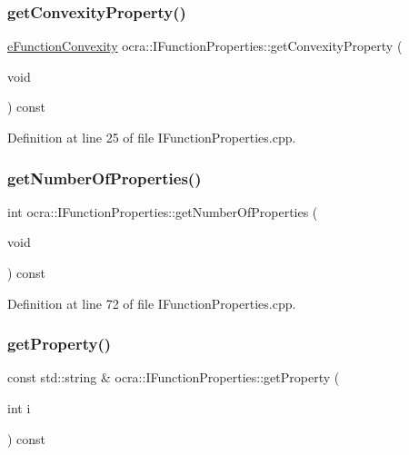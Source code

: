 \subsubsection{\texorpdfstring{get\+Convexity\+Property()}{getConvexityProperty()}}
{\footnotesize\ttfamily \hyperlink{namespaceocra_ae6e8dca6121e9618486a449754876119}{e\+Function\+Convexity} ocra\+::\+I\+Function\+Properties\+::get\+Convexity\+Property (\begin{DoxyParamCaption}\item[{void}]{ }\end{DoxyParamCaption}) const}



Definition at line 25 of file I\+Function\+Properties.\+cpp.

\hypertarget{classocra_1_1IFunctionProperties_ae0290dc1f3be7295512af731ede8c981}{}\label{classocra_1_1IFunctionProperties_ae0290dc1f3be7295512af731ede8c981} 
\subsubsection{\texorpdfstring{get\+Number\+Of\+Properties()}{getNumberOfProperties()}}
{\footnotesize\ttfamily int ocra\+::\+I\+Function\+Properties\+::get\+Number\+Of\+Properties (\begin{DoxyParamCaption}\item[{void}]{ }\end{DoxyParamCaption}) const}



Definition at line 72 of file I\+Function\+Properties.\+cpp.

\hypertarget{classocra_1_1IFunctionProperties_a80d578a7679e4f87594322f963974ef9}{}\label{classocra_1_1IFunctionProperties_a80d578a7679e4f87594322f963974ef9} 
\subsubsection{\texorpdfstring{get\+Property()}{getProperty()}}
{\footnotesize\ttfamily const std\+::string \& ocra\+::\+I\+Function\+Properties\+::get\+Property (\begin{DoxyParamCaption}\item[{int}]{i }\end{DoxyParamCaption}) const}



